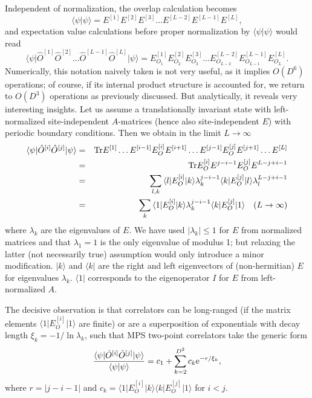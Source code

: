 \documentclass[a4paper,10pt,oneside,onecolumn,1p,times]{elsarticle}
\newcommand{\tr}{{\rm Tr }}
\newcommand{\eul}{{\rm e }}
\newcommand{\bra}[1]{\mbox{$\langle #1  |$}}
\newcommand{\ket}[1]{\mbox{$| #1  \rangle$}}
\newcommand{\braket}[2]{\mbox{$\langle #1  | #2 \rangle$}} 	%
\begin{document}
Independent of normalization, the overlap calculation becomes
\begin{equation}
\braket{\psi}{\psi} = E^{[1]} E^{[2]} E^{[3]} \ldots E^{[L-2]} E^{[L-1]} E^{[L]}  ,
\end{equation}
and expectation value calculations before proper normalization by $\braket{\psi}{\psi}$ would read
\begin{equation}
\bra{\psi} \hat{O}^{[1]} \hat{O}^{[2]} \ldots \hat{O}^{[L-1]} \hat{O}^{[L]}\ket{\psi} = E^{[1]}_{O_1} E^{[2]}_{O_2} E^{[3]}_{O_3} \ldots E^{[L-2]}_{O_{L-2}} E^{[L-1]}_{O_{L-1}} E^{[L]}_{O_L}  .
\end{equation}
Numerically, this notation naively taken is not very useful, as it implies $O(D^6)$ operations; of course, if its internal product structure is accounted for, we return to $O(D^3)$ operations as previously discussed. But analytically, it reveals very interesting insights. Let us assume a translationally invariant state with left-normalized site-independent $A$-matrices (hence also site-independent $E$) with periodic boundary conditions. Then we obtain in the limit $L\rightarrow\infty$
\begin{eqnarray*}
\bra{\psi} \hat{O}^{[i]}\hat{O}^{[j]} \ket{\psi} &=& \tr E^{[1]} \ldots E^{[i-1]} E^{[i]}_O E^{[i+1]} \ldots E^{[j-1]} 
E^{[j]}_O E^{[j+1]} \ldots E^{[L]} \\
&=& \tr E^{[i]}_O E^{j-i-1} E^{[j]}_O E^{L-j+i-1} \\
&=& \sum_{l,k} \bra{l} E^{[i]}_O \ket{k} \lambda_k^{j-i-1} \bra{k} E^{[j]}_O \ket{l} \lambda_l^{L-j+i-1}\\
&=& \sum_k \bra{1} E^{[i]}_O \ket{k} \lambda_k^{j-i-1} \bra{k} E^{[j]}_O \ket{1} \quad (L\rightarrow\infty)
\end{eqnarray*}
where $\lambda_k$ are the eigenvalues of $E$. We have used $|\lambda_k|\leq 1$ for $E$ from normalized matrices and that $\lambda_1=1$ is the only eigenvalue of modulus 1; but relaxing the latter (not necessarily true) assumption would only introduce a minor modification. $\ket{k}$ and $\bra{k}$ are the right and left eigenvectors of (non-hermitian) $E$ for eigenvalues $\lambda_k$. $\bra{1}$ corresponds to the eigenoperator $I$ for $E$ from left-normalized $A$.

The decisive observation is that correlators can be long-ranged (if the matrix elements  $ \bra{1} E^{[i]}_O \ket{1}$ are finite) or are a superposition of exponentials with decay length $\xi_k = -1/ \ln \lambda_k$, such that MPS two-point correlators take the generic form
\begin{equation}
\frac{\bra{\psi} \hat{O}^{[i]} \hat{O}^{[j]} \ket{\psi}}{\braket{\psi}{\psi}} = c_1 + \sum_{k=2}^{D^2} c_k \eul^{-r/\xi_k} ,
\end{equation}
where $r=|j-i-1|$ and $c_k = \bra{1} E^{[i]}_O \ket{k} \bra{k} E^{[j]}_O \ket{1}$ for $i<j$. 
\end{document}
